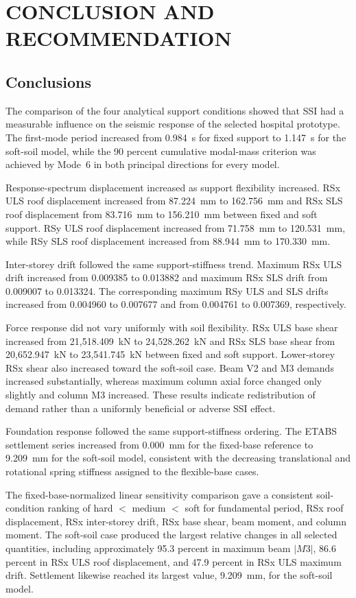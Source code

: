 \chapter{CONCLUSION AND RECOMMENDATION}

\section{Conclusions}
The comparison of the four analytical support conditions showed that SSI had a measurable influence on the seismic response of the selected hospital prototype. The first-mode period increased from 0.984~s for fixed support to 1.147~s for the soft-soil model, while the 90 percent cumulative modal-mass criterion was achieved by Mode~6 in both principal directions for every model.

Response-spectrum displacement increased as support flexibility increased. RSx ULS roof displacement increased from 87.224~mm to 162.756~mm and RSx SLS roof displacement from 83.716~mm to 156.210~mm between fixed and soft support. RSy ULS roof displacement increased from 71.758~mm to 120.531~mm, while RSy SLS roof displacement increased from 88.944~mm to 170.330~mm.

Inter-storey drift followed the same support-stiffness trend. Maximum RSx ULS drift increased from 0.009385 to 0.013882 and maximum RSx SLS drift from 0.009007 to 0.013324. The corresponding maximum RSy ULS and SLS drifts increased from 0.004960 to 0.007677 and from 0.004761 to 0.007369, respectively.

Force response did not vary uniformly with soil flexibility. RSx ULS base shear increased from 21,518.409~kN to 24,528.262~kN and RSx SLS base shear from 20,652.947~kN to 23,541.745~kN between fixed and soft support. Lower-storey RSx shear also increased toward the soft-soil case. Beam V2 and M3 demands increased substantially, whereas maximum column axial force changed only slightly and column M3 increased. These results indicate redistribution of demand rather than a uniformly beneficial or adverse SSI effect.

Foundation response followed the same support-stiffness ordering. The ETABS settlement series increased from 0.000~mm for the fixed-base reference to 9.209~mm for the soft-soil model, consistent with the decreasing translational and rotational spring stiffness assigned to the flexible-base cases.

The fixed-base-normalized linear sensitivity comparison gave a consistent soil-condition ranking of hard $<$ medium $<$ soft for fundamental period, RSx roof displacement, RSx inter-storey drift, RSx base shear, beam moment, and column moment. The soft-soil case produced the largest relative changes in all selected quantities, including approximately 95.3 percent in maximum beam $|M3|$, 86.6 percent in RSx ULS roof displacement, and 47.9 percent in RSx ULS maximum drift. Settlement likewise reached its largest value, 9.209~mm, for the soft-soil model.

